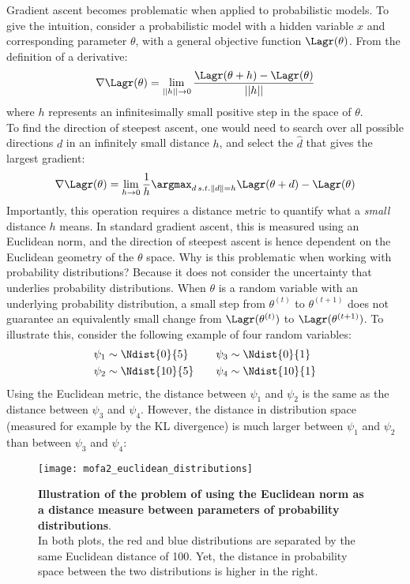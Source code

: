 Gradient ascent becomes problematic when applied to probabilistic models. To give the intuition, consider a probabilistic model with a hidden variable $x$ and corresponding parameter $\theta$, with a general objective function $\Lagr(\theta)$. From the definition of a derivative:
\[
	\nabla \Lagr(\theta) = \lim_{||h||\to0} \frac{\Lagr(\theta + h) - \Lagr(\theta)}{||h||}
\]
where $h$ represents an infinitesimally small positive step in the space of $\theta$.\\
To find the direction of steepest ascent, one would need to search over all possible directions $d$ in an infinitely small distance $h$, and select the $\hat{d}$ that gives the largest gradient:
\[
\nabla \Lagr(\theta) = \lim_{h\to0} \frac{1}{h}\argmax_{d \, s.t. \|d\|=h} \Lagr(\theta+d) - \Lagr(\theta)
\]
Importantly, this operation requires a distance metric to quantify what a \textit{small} distance $h$ means. In standard gradient ascent, this is measured using an Euclidean norm, and the direction of steepest ascent is hence dependent on the Euclidean geometry of the $\theta$ space. Why is this problematic when working with probability distributions? Because it does not consider the uncertainty that underlies probability distributions. When $\theta$ is a random variable with an underlying probability distribution, a small step from $\theta^{(t)}$ to $\theta^{(t+1)}$ does not guarantee an equivalently small change from $\Lagr(\theta^{(t)})$ to $\Lagr(\theta^{(t+1)})$. To illustrate this, consider the following example of four random variables:
\begin{equation}
	\begin{split}
		\psi_1 &\sim \Ndist{0}{5} \\
		\psi_2 &\sim \Ndist{10}{5}
	\end{split}
	\qquad
	\begin{split}
		\psi_3 &\sim \Ndist{0}{1} \\
		\psi_4 &\sim \Ndist{10}{1}
	\end{split}
\end{equation}
Using the Euclidean metric, the distance between $\psi_1$ and $\psi_2$ is the same as the distance between $\psi_3$ and $\psi_4$. However, the distance in distribution space (measured for example by the KL divergence) is much larger between $\psi_1$ and $\psi_2$ than between $\psi_3$ and $\psi_4$:

\begin{figure}[!h]
	\begin{center}
		\texttt{[image: mofa2\_euclidean\_distributions]}
		\caption{\textbf{Illustration of the problem of using the Euclidean norm as a distance measure between parameters of probability distributions}.\\
		In both plots, the red and blue distributions are separated by the same Euclidean distance of 100. Yet, the distance in probability space between the two distributions is higher in the right.
		}
		\label{fig:mofa2_euclidean_distributions}
	\end{center}
\end{figure}

